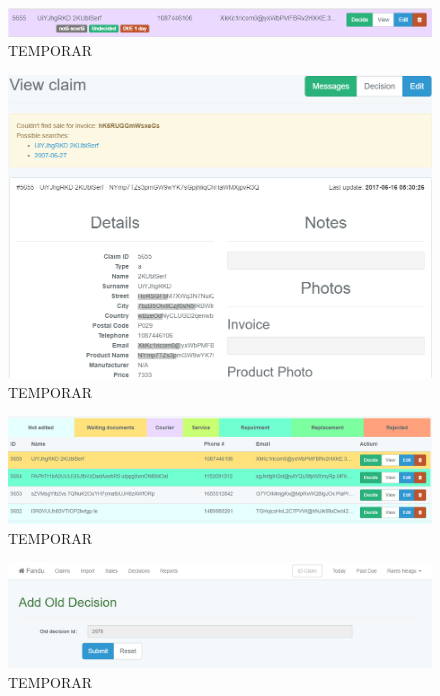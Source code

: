	\begin{figure}
		\includegraphics[width=\linewidth]{../imagini/claims_tags.png}
		\caption{TEMPORAR}
		\label{fig:TEMP}
	\end{figure}
	\begin{figure}
		\includegraphics[width=\linewidth]{../imagini/claims_view.png}
		\caption{TEMPORAR}
		\label{fig:TEMP}
	\end{figure}
	\begin{figure}
		\includegraphics[width=\linewidth]{../imagini/color_coding.png}
		\caption{TEMPORAR}
		\label{fig:TEMP}
	\end{figure}
	\begin{figure}
		\includegraphics[width=\linewidth]{../imagini/decisions_add_conirm.png}
		\caption{TEMPORAR}
		\label{fig:TEMP}
	\end{figure}
